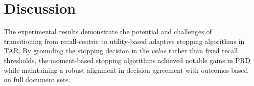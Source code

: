\documentclass[sigconf,natbib=true,anonymous=true]{acmart}
\begin{document}


\section{Discussion}

The experimental results demonstrate the potential and challenges of transitioning from recall-centric to utility-based adaptive stopping algorithms in TAR. By grounding the stopping decision in the \emph{value} rather than fixed recall thresholds, the moment-based stopping algorithms achieved notable gains in PRD while maintaining a robust alignment in decision agreement with outcomes based on full document sets. 

\end{document}
